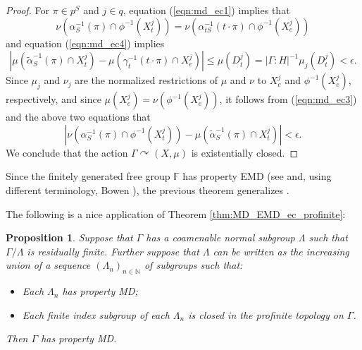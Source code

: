 \documentclass[12pt]{amsart}
\newtheorem{prop}[thm]{Proposition}
\theoremstyle{definition}
\def\bb{\mathbb}
\def\bb{\mathbb}
\newcommand{\acts}{\curvearrowright}
\begin{document}
\begin{proof}
	For $\pi \in p^S$ and $j \in q$, equation (\ref{eqn:md_ec1}) implies that
	\begin{equation*}
		\nu(\alpha_S^{-1}(\pi) \cap \phi^{-1}(X_t^j)) = \nu(\alpha_{t S}^{-1}(t \cdot \pi) \cap \phi^{-1}(X_{e}^j))
	\end{equation*}
	and equation (\ref{eqn:md_ec4}) implies
	\begin{equation*}
		\left| \mu(\tilde{\alpha}_S^{-1}(\pi) \cap X_t^j) - \mu(\gamma_t^{-1}(t \cdot \pi) \cap X_{e}^j) \right| \leq \mu(D_t^j) = |\Gamma : H|^{-1} \mu_j(D_t^j) < \epsilon.
	\end{equation*}
	Since $\mu_j$ and $\nu_j$ are the normalized restrictions of $\mu$ and $\nu$ to $X_{e}^j$ and $\phi^{-1}(X_{e}^j)$, respectively, and since $\mu(X_{e}^j) = \nu(\phi^{-1}(X_{e}^j))$, it follows from (\ref{eqn:md_ec3}) and the above two equations that
	$$\left| \nu(\alpha_S^{-1}(\pi) \cap \phi^{-1}(X_t^j)) - \mu(\tilde{\alpha}_S^{-1}(\pi) \cap X_t^j) \right| < \epsilon.$$
	We conclude that the action $\Gamma \acts (X, \mu)$ is existentially closed.
\end{proof}


Since the finitely generated free group $\bb F$ has property EMD (see \cite[Theorem 1]{kechrisweak} and, using different terminology, Bowen \cite{Bowen03}), the previous theorem generalizes \cite[Theorems 6.7 and 6.18]{BIH}.

The following is a nice application of Theorem \ref{thm:MD_EMD_ec_profinite}:

\begin{prop}\label{MDcriterion}
Suppose that $\Gamma$ has a coamenable normal subgroup $\Lambda$ such that $\Gamma/\Lambda$ is residually finite.  Further suppose that $\Lambda$ can be written as the increasing union of a sequence $(\Lambda_n)_{n\in \bb N}$ of subgroups such that:
\begin{itemize}
    \item Each $\Lambda_n$ has property MD;
    \item Each finite index subgroup of each $\Lambda_n$ is closed in the profinite topology on $\Gamma$.
\end{itemize}
Then $\Gamma$ has property MD.
\end{prop}
\end{document}
